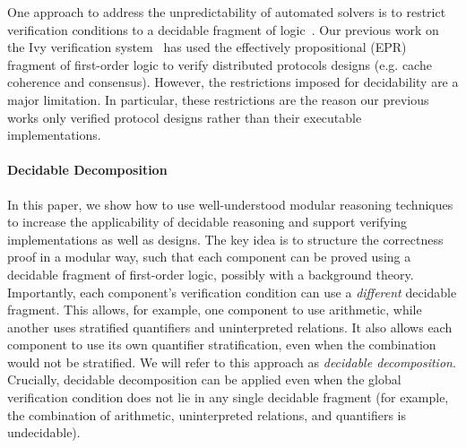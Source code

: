 One approach to address the unpredictability of automated solvers is
to restrict verification conditions to a decidable fragment of
logic~\cite{dragoi_psync:_2016,DBLP:conf/tacas/HenriksenJJKPRS95,SmallFootDecidable,MadhusudanPQ11}.
Our previous work on the Ivy verification system~\cite{Ivy,
  ken_fmcad16, oopsla17-epr} has used the effectively propositional
(EPR) fragment of first-order logic to verify distributed protocols
designs (e.g. cache coherence and consensus). However, the
restrictions imposed for decidability are a major limitation. In
particular, these restrictions are the reason our previous works only
verified protocol designs rather than their executable
implementations.

\paragraph{Decidable Decomposition}

In this paper, we show how to use well-understood modular reasoning
techniques to increase the applicability of decidable reasoning
and support verifying implementations as well as designs.
The key idea is to structure the correctness proof in a modular way,
such that each component can be proved using a decidable fragment of first-order logic,
possibly with a background theory. Importantly, each component's
verification condition can use a \emph{different} decidable fragment.
This allows, for example, one component to use arithmetic, while another uses
stratified quantifiers and uninterpreted relations. It also allows
each component to use its own quantifier stratification, even when
the combination would not be stratified. We will refer to
this approach as \emph{decidable decomposition}.  Crucially, decidable
decomposition can be applied even when the global verification
condition does not lie in any single decidable fragment (for example,
the combination of arithmetic, uninterpreted relations, and
quantifiers is undecidable).


